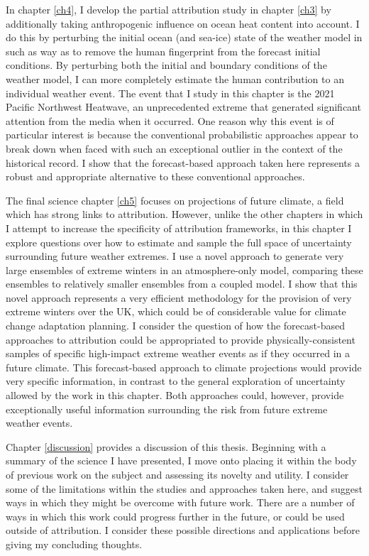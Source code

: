   In chapter \ref{ch4}, I develop the partial attribution study in chapter \ref{ch3} by additionally taking anthropogenic influence on ocean heat content into account. I do this by perturbing the initial ocean (and sea-ice) state of the weather model in such as way as to remove the human fingerprint from the forecast initial conditions. By perturbing both the initial and boundary conditions of the weather model, I can more completely estimate the human contribution to an individual weather event. The event that I study in this chapter is the 2021 Pacific Northwest Heatwave, an unprecedented extreme that generated significant attention from the media when it occurred. One reason why this event is of particular interest is because the conventional probabilistic approaches appear to break down when faced with such an exceptional outlier in the context of the historical record. I show that the forecast-based approach taken here represents a robust and appropriate alternative to these conventional approaches.

  The final science chapter \ref{ch5} focuses on projections of future climate, a field which has strong links to attribution. However, unlike the other chapters in which I attempt to increase the specificity of attribution frameworks, in this chapter I explore questions over how to estimate and sample the full space of uncertainty surrounding future weather extremes. I use a novel approach to generate very large ensembles of extreme winters in an atmosphere-only model, comparing these ensembles to relatively smaller ensembles from a coupled model. I show that this novel approach represents a very efficient methodology for the provision of very extreme winters over the UK, which could be of considerable value for climate change adaptation planning. I consider the question of how the forecast-based approaches to attribution could be appropriated to provide physically-consistent samples of specific high-impact extreme weather events as if they occurred in a future climate. This forecast-based approach to climate projections would provide very specific information, in contrast to the general exploration of uncertainty allowed by the work in this chapter. Both approaches could, however, provide exceptionally useful information surrounding the risk from future extreme weather events.

  Chapter \ref{discussion} provides a discussion of this thesis. Beginning with a summary of the science I have presented, I move onto placing it within the body of previous work on the subject and assessing its novelty and utility. I consider some of the limitations within the studies and approaches taken here, and suggest ways in which they might be overcome with future work. There are a number of ways in which this work could progress further in the future, or could be used outside of attribution. I consider these possible directions and applications before giving my concluding thoughts.
